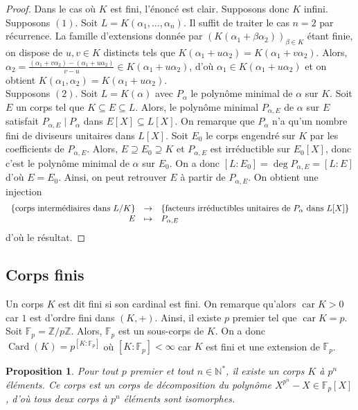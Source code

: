 \documentclass{article}
\newcommand{\N}{\mathbb{N}}
\newcommand{\Z}{\mathbb{Z}}
\newcommand{\F}{\mathbb{F}}
\DeclareMathOperator{\Card}{Card}
\DeclareMathOperator{\car}{car}
\newcommand{\applic}[4]{\begin{array}[t]{rcl}
#1 & \to & #2 \\
#3 & \mapsto & #4
\end{array}}
\theoremstyle{plain}
\newtheorem{proposition}[theorem]{Proposition}
\theoremstyle{definition}
\theoremstyle{remark}
\begin{document}
\begin{proof}
    Dans le cas où $K$ est fini, l'énoncé est clair. Supposons donc $K$ infini. \\
    Supposons $(1)$. Soit $L = K(\alpha_1,\dots,\alpha_n)$. Il suffit de traiter le cas $n=2$ par récurrence. La famille d'extensions donnée par $(K(\alpha_1 + \beta \alpha_2))_{\beta \in K}$ étant finie, on dispose de $u,v \in K$ distincts tels que $K(\alpha_1 + u \alpha_2) = K(\alpha_1 + v \alpha_2)$. Alors, $\alpha_2 = \frac{(\alpha_1+v\alpha_2) - (\alpha_1 + u \alpha_2)}{v-u} \in K(\alpha_1 + u \alpha_2)$, d'où $\alpha_1 \in K(\alpha_1 + u \alpha_2)$ et on obtient $K(\alpha_1,\alpha_2) = K(\alpha_1 + u\alpha_2)$. \\
    Supposons $(2)$. Soit $L = K(\alpha)$ avec $P_\alpha$ le polynôme minimal de $\alpha$ sur $K$. Soit $E$ un corps tel que $K \subseteq E \subseteq L$. Alors, le polynôme minimal $P_{\alpha,E}$ de $\alpha$ sur $E$ satisfait $P_{\alpha, E} \mid P_\alpha$ dans $E[X] \subseteq L[X]$. On remarque que $P_\alpha$ n'a qu'un nombre fini de diviseurs unitaires dans $L[X]$. Soit $E_0$ le corps engendré sur $K$ par les coefficients de $P_{\alpha, E}$. Alors, $E \supseteq E_0 \supseteq K$ et $P_{\alpha, E}$ est irréductible sur $E_0 [X]$, donc c'est le polynôme minimal de $\alpha$ sur $E_0$. On a donc $[L : E_0] = \deg P_{\alpha, E} = [L : E]$ d'où $E = E_0$. Ainsi, on peut retrouver $E$ à partir de $P_{\alpha, E}$. On obtient une injection
    \[\applic{\{\text{corps intermédiaires dans }L/K\}}{\{\text{facteurs irréductibles unitaires de $P_\alpha$ dans $L[X]$}\}}{E}{P_{\alpha,E}}\]
    d'où le résultat.
\end{proof}

\subsection{Corps finis}

Un corps $K$ est dit fini si son cardinal est fini. On remarque qu'alors $\car K > 0$ car $1$ est d'ordre fini dans $(K,+)$. Ainsi, il existe $p$ premier tel que $\car K = p$. Soit $\F_p = \Z/p\Z$. Alors, $\F_p$ est un sous-corps de $K$. On a donc $\Card(K) = p^{[K : \F_p]}$ où $[K : \F_p] < \infty$ car $K$ est fini et une extension de $\F_p$.

\begin{proposition}
    Pour tout $p$ premier et tout $n \in \N^*$, il existe un corps $K$ à $p^n$ éléments. Ce corps est un corps de décomposition du polynôme $X^{p^n} - X \in \F_p [X]$, d'où tous deux corps à $p^n$ éléments sont isomorphes.
\end{proposition}
\end{document}
